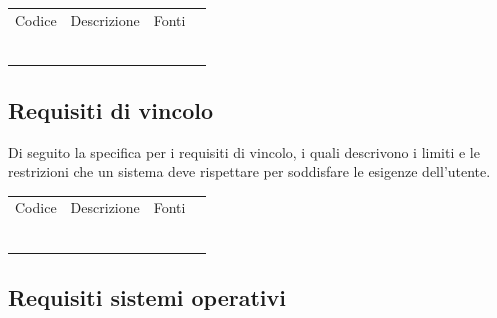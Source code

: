 \documentclass{article}
\begin{document}
\begin{center}
    \begin{tabular}{|p{3cm}|p{6cm}|p{}|p{3cm}|}
    \rowcolor{Blue} 
\hline
Codice & Descrizione & Fonti  \\ 
\rowcolor{LightBlue}
\hline
& &  \\ 
\rowcolor{LighterBlue}
\hline
 & & \\ 
\rowcolor{LightBlue}
\hline
 & & \\
\hline
\rowcolor{LighterBlue}

& & \\
\rowcolor{LightBlue}
\hline
& & \\
\hline
\rowcolor{LighterBlue}

 & & \\
\hline
\end{tabular}
\end{center}



\subsection{Requisiti di vincolo}
Di seguito la specifica per i requisiti di vincolo, i quali descrivono i limiti e le restrizioni che un sistema
deve rispettare per soddisfare le esigenze dell'utente. 
\begin{center}
    \begin{tabular}{|p{3cm}|p{6cm}|p{}|p{3cm}|}
    \rowcolor{Blue} 
\hline
Codice & Descrizione & Fonti  \\ 
\rowcolor{LightBlue}
\hline
& &  \\ 
\rowcolor{LighterBlue}
\hline
 & & \\ 
\rowcolor{LightBlue}
\hline
 & & \\
\hline
\rowcolor{LighterBlue}

& & \\
\rowcolor{LightBlue}
\hline
& & \\
\hline
\rowcolor{LighterBlue}

 & & \\
\hline
\end{tabular}
\end{center}

\subsection{Requisiti sistemi operativi}
\end{document}
